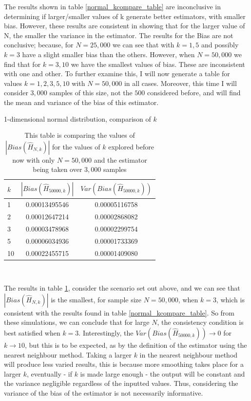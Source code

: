 \documentclass{article}
\begin{document}
The results shown in table \ref{normal_kcompare_table} are inconclusive in determining if larger/smaller values of k generate better estimators, with smaller bias. However, these results are consistent in showing that for the larger value of N, the smaller the variance in the estimator. The results for the Bias are not conclusive; because, for $N=25,000$ we can see that with $k=1, 5$ and possibly $k=3$ have a slight smaller bias than the others. However, when $N=50,000$ we find that for $k=3, 10$ we have the smallest values of bias. These are inconsistent with one and other. To further examine this, I will now generate a table for values $k=1, 2, 3, 5, 10$ with $N=50,000$ in all cases. Moreover, this time I will consider $3,000$ samples of this size, not the $500$ considered before, and will find the mean and variance of the bias of this estimator.

\begin{table}
\caption{1-dimensional normal distribution, comparison of $k$} \label{normal_kcompare2_table}
\begin{center}
\begin{tabular}{| l | c c |} 
\toprule
$k$ &  $|Bias(\hat{H}_{50000, k})|$ & $Var(Bias(\hat{H}_{50000, k}))$ \\
\midrule[1pt]
1      & 0.00013495546     & 0.00005116758  \\
2      & 0.00012647214     & 0.00002868082  \\
3      & 0.00003478968     & 0.00002299754  \\
5      & 0.00006034936     & 0.00001733369  \\
10    & 0.00022455715     & 0.00001409080  \\
\hline
\end{tabular}
\\[10pt]
\caption*{This table is comparing the values of $|Bias(\hat{H}_{N, k})|$ for the values of $k$ explored before now with only $N=50,000$ and the estimator being taken over $3,000$ samples}
\end{center}
\end{table}

The results in table \ref{normal_kcompare2_table}, consider the scenario set out above, and we can see that $|Bias(\hat{H}_{N, k})|$ is the smallest, for sample size $N=50,000$, when $k=3$, which is consistent with the results found in table \ref{normal_kcompare_table}. So from these simulations, we can conclude that for large $N$, the consistency condition is best satisfied when $k=3$. Interestingly, the $Var(Bias(\hat{H}_{50000, k})) \to 0$ for $k \to 10$, but this is to be expected, as by the definition of the estimator using the nearest neighbour method. Taking a larger $k$ in the nearest neighbour method will produce less varied results, this is because more smoothing takes place for a larger $k$, eventually - if $k$ is made large enough - the output will be constant and the variance negligible regardless of the inputted values. Thus, considering the variance of the bias of the estimator is not necessarily informative.
\end{document}
